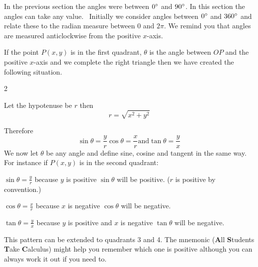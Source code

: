 In the previous section the angles were between $0 \mbox{{\ensuremath{{}^\circ}}}$ and $90 \mbox{{\ensuremath{{}^\circ}}}$. In this section the angles can take any value.
\ Initially we consider angles between $0 \mbox{{\ensuremath{{}^\circ}}}$ and $360 \mbox{{\ensuremath{{}^\circ}}}$ and relate these to the radian measure between $0$ and $2 \pi $. We remind you that angles are measured anticlockwise from the positive $x$-axis. 

If the point $P (x ,y)$ is in the first quadrant, $\theta $ is the angle between $OP$ and the positive $x$-axis and we complete the right triangle then we have created the following situation.  
\columnsep =30pt
\begin {multicols}{2}
\setlength\fboxrule{0in}\setlength\fboxsep{0.2in}

Let the hypotenuse be $r$ then
\begin{equation*}r =\sqrt{x^{2} +y^{2}}
\end{equation*}
\end {multicols}
Therefore
\begin{equation*}\sin  \theta  =\frac{y}{r}\text{}\cos  \theta  =\frac{x}{r}\text{and}\tan  \theta  =\frac{y}{x}
\end{equation*}
We now let $\theta $ be any angle and define sine, cosine and tangent in the same way. For instance
if $P (x ,y)$ is in the second quadrant:    
\setlength\fboxrule{0in}\setlength\fboxsep{0.2in}

$\sin  \theta  =\frac{y}{r}$ because $y$ is positive $\sin  \theta $ will be positive. ($r$ is positive by convention.) 

$\cos  \theta  =\frac{x}{r}$ because $x$ is negative $\cos  \theta $ will be negative. 

$\tan  \theta  =\frac{y}{x}$ because $y$ is positive and $x$ is negative $\tan  \theta $ will be negative. 

This pattern can be extended to quadrants 3 and 4. The mnemonic (\textbf{A}ll \textbf{S}tudents \textbf{T}ake \textbf{C}alculus) might help you remember which one is positive although you can always work it out if you need to. 

